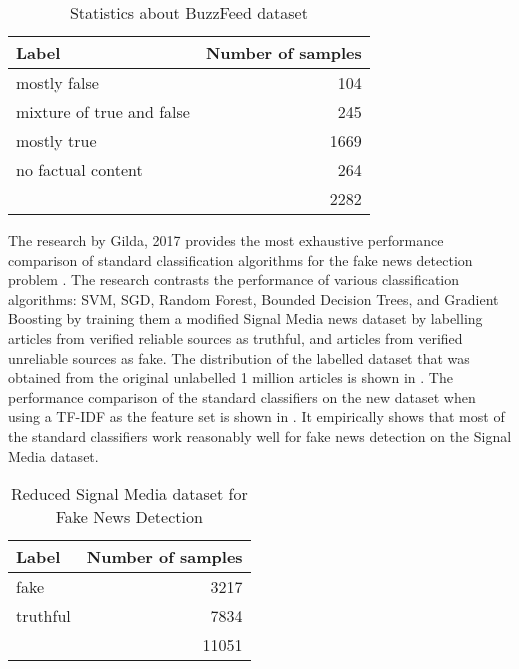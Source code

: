 \begin{table}[h]
\begin{center}
\caption{Statistics about BuzzFeed dataset}
\label{tbl:buzzfeed_dataset}
\begin{tabular}{lr}
\toprule 
Label&Number of samples \\
\midrule 
mostly false&104 \\
mixture of true and false&245 \\
mostly true&1669 \\
no factual content&264 \\
\midrule
&2282 \\
\bottomrule
\end{tabular}
\end{center}
\end{table}

The research by Gilda, 2017 provides the most exhaustive performance comparison of standard classification algorithms for the fake news detection problem \cite{gilda2017evaluating}. The research contrasts the performance of various classification algorithms: SVM, SGD, Random Forest, Bounded Decision Trees, and Gradient Boosting by training them a modified Signal Media news dataset \cite{corney2016million} by labelling articles from verified reliable sources as truthful, and articles from verified unreliable sources as fake. The distribution of the labelled dataset that was obtained from the original unlabelled 1 million articles is shown in . The performance comparison of the standard classifiers on the new dataset when using a TF-IDF as the feature set is shown in  \cite{gilda2017evaluating}. It empirically shows that most of the standard classifiers work reasonably well for fake news detection on the Signal Media dataset.

\begin{table}[h]
\begin{center}
\caption{Reduced Signal Media dataset for Fake News Detection}
\label{tbl:reduced_signal_media_dataset}
\begin{tabular}{lr}
\toprule 
Label&Number of samples \\
\midrule 
fake&3217 \\
truthful&7834 \\
\midrule
&11051 \\
\bottomrule
\end{tabular}
\end{center}
\end{table}

